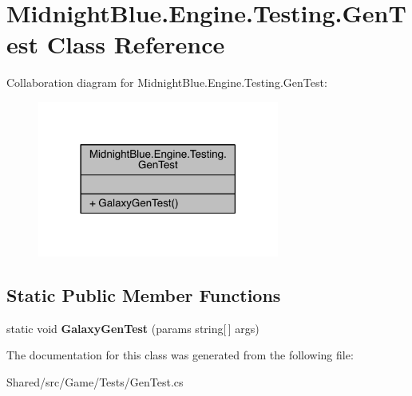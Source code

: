 \hypertarget{class_midnight_blue_1_1_engine_1_1_testing_1_1_gen_test}{}\section{Midnight\+Blue.\+Engine.\+Testing.\+Gen\+Test Class Reference}
\label{class_midnight_blue_1_1_engine_1_1_testing_1_1_gen_test}


Collaboration diagram for Midnight\+Blue.\+Engine.\+Testing.\+Gen\+Test\+:
\nopagebreak
\begin{figure}[H]
\begin{center}
\leavevmode
\includegraphics[width=225pt]{class_midnight_blue_1_1_engine_1_1_testing_1_1_gen_test__coll__graph}
\end{center}
\end{figure}
\subsection*{Static Public Member Functions}
\begin{DoxyCompactItemize}
\item 
\hypertarget{class_midnight_blue_1_1_engine_1_1_testing_1_1_gen_test_a3fdb5384feac2712b58f78d7720fb85d}{}\label{class_midnight_blue_1_1_engine_1_1_testing_1_1_gen_test_a3fdb5384feac2712b58f78d7720fb85d} 
static void {\bfseries Galaxy\+Gen\+Test} (params string\mbox{[}$\,$\mbox{]} args)
\end{DoxyCompactItemize}


The documentation for this class was generated from the following file\+:\begin{DoxyCompactItemize}
\item 
Shared/src/\+Game/\+Tests/Gen\+Test.\+cs\end{DoxyCompactItemize}
